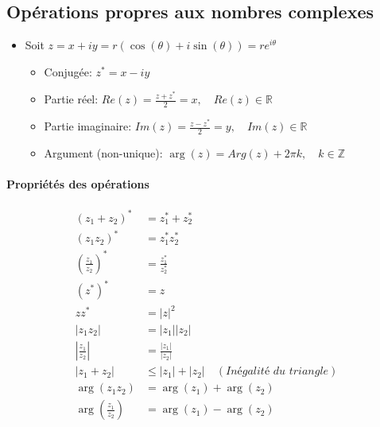 \subsection*{Opérations propres aux nombres complexes}
\begin{itemize}
    \item[] Soit $z = x + iy = r(\cos(\theta)+i\sin(\theta)) = re^{i\theta}$
    \begin{itemize}[itemsep = 0.5em]
        \item[] Conjugée: $z^{*} = x - iy$
        \item[] Partie réel: $Re(z) = \frac{z + z^{*}}{2} = x, \quad Re(z) \in \mathbb{R}$
        \item[] Partie imaginaire: $Im(z) = \frac{z - z^{*}}{2} = y, \quad Im(z) \in \mathbb{R}$
        \item[] Argument (non-unique): $\arg(z) = Arg(z) + 2\pi k, \quad k \in \mathbb{Z}$
      \end{itemize}
\end{itemize}


\paragraph*{Propriétés des opérations}
\begingroup
\addtolength{\jot}{0.5em}
\begin{align*}
    \left(z_1 + z_2\right)^* &= z_1^* + z_2^* \\
    \left(z_1z_2\right)^* &= z_1^{*} z_2^* \\
    \left( \frac{z_1}{z_2}\right)^{*} &= \frac{z_1^*}{z_2^*} \\
    \left(z^*\right)^* &= z \\
    zz^{*} &= |z|^2 \\
    |z_1z_2| &= |z_1||z_2|\\
    \left| \frac{z_1}{z_2} \right| &= \frac{|z_1|}{|z_2|} \\
    \left|z_1 + z_2\right| &\leq |z_1| + |z_2| \quad (\textit{Inégalité du triangle}) \\
    \arg(z_1z_2) &= \arg(z_1) + \arg(z_2) \\
    \arg\left( \frac{z_1}{z_2}\right) &= \arg(z_1) - \arg(z_2)
\end{align*}
\endgroup


